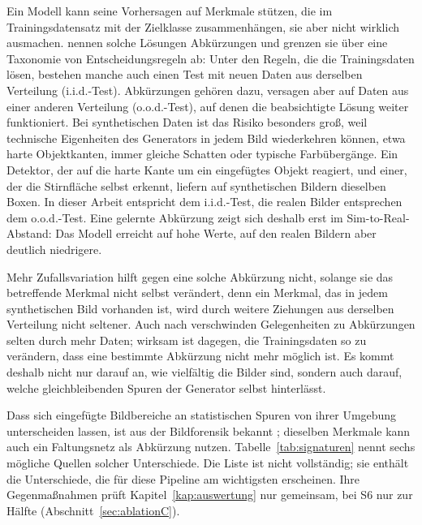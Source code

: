 Ein Modell kann seine Vorhersagen auf Merkmale
stützen, die im Trainingsdatensatz mit der Zielklasse zusammenhängen, sie aber
nicht wirklich ausmachen. \textcite{geirhos2020} nennen solche Lösungen
Abkürzungen und grenzen sie über eine Taxonomie von Entscheidungsregeln ab:
Unter den Regeln, die die Trainingsdaten lösen, bestehen manche auch einen Test
mit neuen Daten aus derselben Verteilung (i.i.d.-Test). Abkürzungen gehören
dazu, versagen aber auf Daten aus einer anderen Verteilung (o.o.d.-Test), auf
denen die beabsichtigte Lösung weiter funktioniert. Bei synthetischen Daten ist
das Risiko besonders groß, weil technische Eigenheiten des Generators in jedem
Bild wiederkehren können, etwa harte Objektkanten, immer gleiche Schatten oder
typische Farbübergänge. Ein Detektor, der auf die harte Kante um ein
eingefügtes Objekt reagiert, und einer, der die Stirnfläche selbst erkennt,
liefern auf synthetischen Bildern dieselben Boxen. In dieser Arbeit entspricht
 dem i.i.d.-Test, die realen Bilder entsprechen dem o.o.d.-Test.
Eine gelernte Abkürzung zeigt sich deshalb erst im Sim-to-Real-Abstand: Das
Modell erreicht auf  hohe Werte, auf den realen Bildern aber deutlich
niedrigere.

Mehr Zufallsvariation hilft gegen eine solche Abkürzung nicht, solange sie das
betreffende Merkmal nicht selbst verändert, denn ein Merkmal, das in jedem
synthetischen Bild vorhanden ist, wird durch weitere Ziehungen aus derselben
Verteilung nicht seltener. Auch nach \textcite{geirhos2020} verschwinden
Gelegenheiten zu Abkürzungen selten durch mehr Daten; wirksam ist dagegen, die
Trainingsdaten so zu verändern, dass eine bestimmte Abkürzung nicht mehr
möglich ist. Es kommt deshalb nicht nur darauf an, wie vielfältig die Bilder
sind, sondern auch darauf, welche gleichbleibenden Spuren der Generator selbst
hinterlässt.

 Dass sich eingefügte Bildbereiche an
statistischen Spuren von ihrer Umgebung unterscheiden lassen, ist aus der
Bildforensik bekannt \parencite{farid2009}; dieselben Merkmale kann auch ein
Faltungsnetz als Abkürzung nutzen. Tabelle~\ref{tab:signaturen} nennt sechs
mögliche Quellen solcher Unterschiede. Die Liste ist nicht vollständig; sie
enthält die Unterschiede, die für diese Pipeline am wichtigsten erscheinen.
Ihre Gegenmaßnahmen prüft Kapitel~\ref{kap:auswertung} nur gemeinsam, bei S6
nur zur Hälfte (Abschnitt~\ref{sec:ablationC}).


